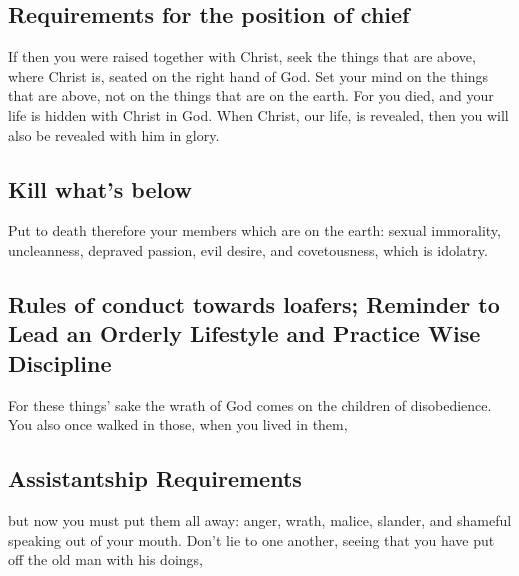 \hypertarget{requirements-for-the-position-of-chief}{%
\subsection{Requirements for the position of
chief}\label{requirements-for-the-position-of-chief}}

 If then you were raised together with Christ, seek the
things that are above, where Christ is, seated on the right hand of God.
 Set your mind on the things that are above, not on the
things that are on the earth.  For you died, and your life
is hidden with Christ in God.  When Christ, our life, is
revealed, then you will also be revealed with him in glory.

\hypertarget{kill-whats-below}{%
\subsection{Kill what's below}\label{kill-whats-below}}

 Put to death therefore your members which are on the
earth: sexual immorality, uncleanness, depraved passion, evil desire,
and covetousness, which is idolatry.

\hypertarget{rules-of-conduct-towards-loafers-reminder-to-lead-an-orderly-lifestyle-and-practice-wise-discipline}{%
\subsection{Rules of conduct towards loafers; Reminder to Lead an
Orderly Lifestyle and Practice Wise
Discipline}\label{rules-of-conduct-towards-loafers-reminder-to-lead-an-orderly-lifestyle-and-practice-wise-discipline}}

 For these things' sake the wrath of God comes on the
children of disobedience.  You also once walked in those,
when you lived in them,

\hypertarget{assistantship-requirements}{%
\subsection{Assistantship
Requirements}\label{assistantship-requirements}}

 but now you must put them all away: anger, wrath, malice,
slander, and shameful speaking out of your mouth.  Don't
lie to one another, seeing that you have put off the old man with his
doings,

